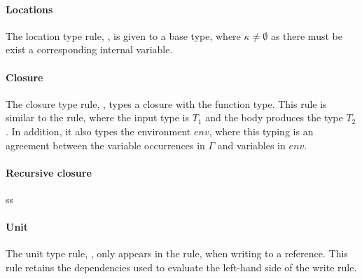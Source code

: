 \documentclass[../../master.tex]{subfiles}
\begin{document}
\paragraph{Locations}
The location type rule, , is given to a base type, where $\kappa\neq\emptyset$ as there must be exist a corresponding internal variable.

\paragraph{Closure}
The closure type rule, , types a closure with the function type.
This rule is similar to the  rule, where the input type is $T_1$ and the body produces the type $T_2$.
In addition, it also types the environment $env$, where this typing is an agreement between the variable occurrences in $\Gamma$ and variables in $env$.

\paragraph{Recursive closure}
ss

\paragraph{Unit}
The unit type rule, , only appears in the  rule, when writing to a reference.
This rule retains the dependencies used to evaluate the left-hand side of the write rule.
\end{document}
